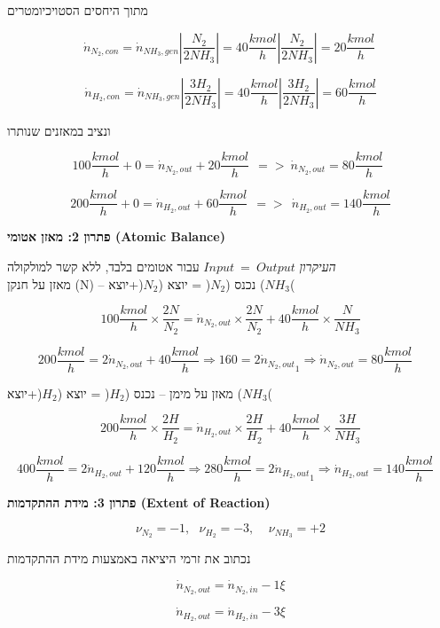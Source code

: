 \documentclass[
  hebrew,
  letterpaper,
  DIV=11,
  numbers=noendperiod]{scrreprt}
\begin{document}
מתוך היחסים הסטויכיומטרים

\[{\dot{n}}_{N_{2},con} = {\dot{n}}_{{NH}_{3},gen}\left| \frac{N_{2}}{2NH_{3}} \right| = 40\frac{kmol}{h}\left| \frac{N_{2}}{2NH_{3}} \right| = 20\frac{kmol}{h}\ \]

\[{\dot{n}}_{H_{2},con} = {\dot{n}}_{{NH}_{3},gen}\left| \frac{3H_{2}}{2NH_{3}} \right| = 40\frac{kmol}{h}\left| \frac{3H_{2}}{2NH_{3}} \right| = 60\frac{kmol}{h}\]

ונציב במאזנים שנותרו

\[100\frac{kmol}{h} + 0 = {\dot{n}}_{N_{2},out} + 20\frac{kmol}{h}\ \  = > \ {\dot{n}}_{N_{2},out} = 80\frac{kmol}{h}\ \ \]

\[200\frac{kmol}{h} + 0 = {\dot{n}}_{H_{2},out} + 60\frac{kmol}{h}\ \  = > \ \ {\dot{n}}_{H_{2},out} = 140\frac{kmol}{h}\]

\textbf{פתרון 2: מאזן אטומי (Atomic Balance)}

\emph{העיקרון} \(Input\  = \ Output\) עבור אטומים בלבד, ללא קשר
למולקולה\\

מאזן על חנקן (N) -- נכנס (\(N_{2}\)( = יוצא (\(N_{2}\)(+יוצא
(\({NH}_{3}\)(

\[100\frac{kmol}{h} \times \frac{2N}{N_{2}} = {\dot{n}}_{N_{2},out} \times \frac{2N}{N_{2}} + 40\frac{kmol}{h} \times \frac{N}{{NH}_{3}}\]

\[200\frac{kmol}{h} = 2{\dot{n}}_{N_{2},out} + 40\frac{kmol}{h} \Rightarrow 160 = {2{\dot{n}}_{N_{2},out}}_{1} \Rightarrow {\dot{n}}_{N_{2},out} = 80\frac{kmol}{h}\ \text{  }\]

מאזן על מימן -- נכנס (\(H_{2}\)( = יוצא (\(H_{2}\)(+יוצא (\({NH}_{3}\)(

\[200\frac{kmol}{h} \times \frac{2H}{H_{2}} = {\dot{n}}_{H_{2},out} \times \frac{2H}{H_{2}} + 40\frac{kmol}{h} \times \frac{3H}{{NH}_{3}}\]

\[400\frac{kmol}{h} = 2{\dot{n}}_{H_{2},out} + 120\frac{kmol}{h} \Rightarrow 280\frac{kmol}{h} = {2{\dot{n}}_{H_{2},out}}_{1} \Rightarrow {\dot{n}}_{H_{2},out} = 140\frac{kmol}{h}\ \text{  }\]

\textbf{פתרון 3: מידת ההתקדמות (Extent of Reaction)}

\[\nu_{N_{2}} = - 1,\ \ \ \nu_{H_{2}} = - 3,\ \ \ \ \ \nu_{NH_{3}} = + 2\]

נכתוב את זרמי היציאה באמצעות מידת ההתקדמות

\[{\dot{n}}_{N_{2},out} = {\dot{n}}_{N_{2},in} - 1\xi\]

\[{\dot{n}}_{H_{2},out} = {\dot{n}}_{H_{2},in} - 3\xi\]
\end{document}
